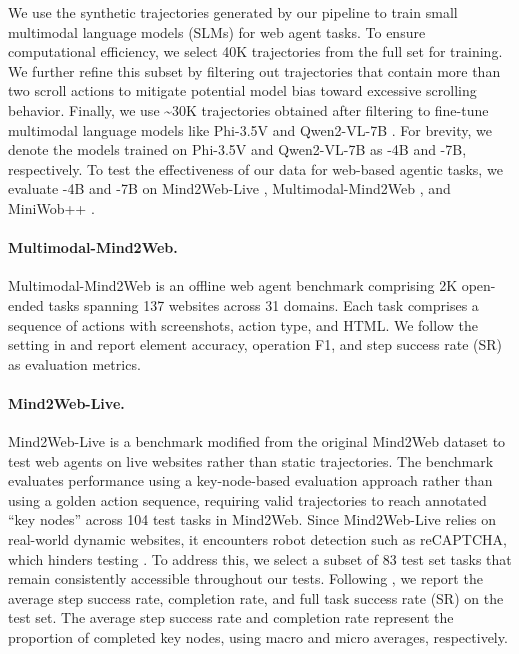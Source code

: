 
We use the synthetic trajectories generated by our pipeline to train small multimodal language models (SLMs) for web agent tasks.
To ensure computational efficiency, we select 40K trajectories from the full set for training.
We further refine this subset by filtering out trajectories that contain more than two scroll actions to mitigate potential model bias toward excessive scrolling behavior.
Finally, we use \textasciitilde30K trajectories obtained after filtering to fine-tune multimodal language models like Phi-3.5V \cite{abdin2024phi} and Qwen2-VL-7B \cite{Qwen2VL}.
For brevity, we denote the models trained on Phi-3.5V and Qwen2-VL-7B as \model-4B and \model-7B, respectively.
To test the effectiveness of our data  for web-based agentic tasks, we evaluate \model-4B and \model-7B
on Mind2Web-Live \cite{pan2024webcanvas}, Multimodal-Mind2Web \cite{mind2web, zheng2024gpt}, and MiniWob++ \cite{miniwob}.


\paragraph{Multimodal-Mind2Web.}
Multimodal-Mind2Web is an offline web agent benchmark comprising 2K open-ended tasks spanning 137 websites across 31 domains. 
Each task comprises a sequence of actions with screenshots, action type, and HTML.
We follow the setting in \citet{zheng2024gpt}
and report element accuracy, operation F1, and step success rate (SR) as evaluation metrics.

\paragraph{Mind2Web-Live.}
Mind2Web-Live is a benchmark modified
from the original Mind2Web dataset to test
web agents on live websites rather than static trajectories.
The benchmark evaluates performance using a key-node-based evaluation approach rather than using a golden action sequence, requiring valid trajectories to reach annotated ``key nodes'' across 104 test tasks in Mind2Web.
Since Mind2Web-Live relies on real-world dynamic websites, it encounters robot detection such as reCAPTCHA, which hinders testing \cite{xu2024aguvis}.
To address this, we select a subset of 83 test set tasks that remain consistently accessible throughout our tests.
Following \citet{pan2024webcanvas}, we report the average step success rate, completion rate, and full task success rate (SR) on the test set.
The average step success rate and completion rate represent the proportion of completed key nodes, using macro and micro averages, respectively.

